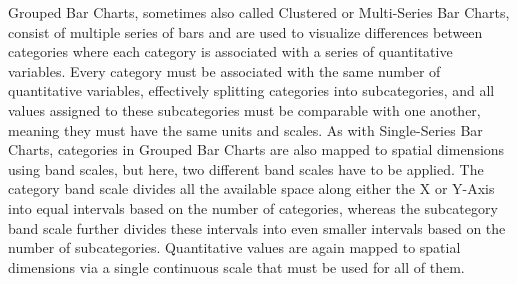 Grouped Bar Charts, sometimes also called Clustered or Multi-Series Bar Charts, consist of multiple series of bars and are used to visualize differences between categories where each category is associated with a series of quantitative variables.
Every category must be associated with the same number of quantitative variables, effectively splitting categories into subcategories, and all values assigned to these subcategories must be comparable with one another, meaning they must have the same units and scales.
As with Single-Series Bar Charts, categories in Grouped Bar Charts are also mapped to spatial dimensions using band scales, but here, two different band scales have to be applied.
The category band scale divides all the available space along either the X or Y-Axis into equal intervals based on the number of categories, whereas the subcategory band scale further divides these intervals into even smaller intervals based on the number of subcategories.
Quantitative values are again mapped to spatial dimensions via a single continuous scale that must be used for all of them.

